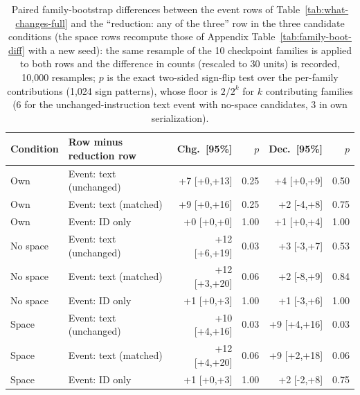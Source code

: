 \begin{table}[t]
\centering\scriptsize
\setlength{\tabcolsep}{2pt}
\begin{tabular}{@{}llrrrr@{}}
\toprule
Condition & Row minus reduction row & Chg.\ [95\%] & $p$ & Dec.\ [95\%] & $p$ \\
\midrule
Own & Event: text (unchanged) & +7 [+0,+13] & 0.25 & +4 [+0,+9] & 0.50 \\
Own & Event: text (matched) & +9 [+0,+16] & 0.25 & +2 [-4,+8] & 0.75 \\
Own & Event: ID only & +0 [+0,+0] & 1.00 & +1 [+0,+4] & 1.00 \\
No space & Event: text (unchanged) & +12 [+6,+19] & 0.03 & +3 [-3,+7] & 0.53 \\
No space & Event: text (matched) & +12 [+3,+20] & 0.06 & +2 [-8,+9] & 0.84 \\
No space & Event: ID only & +1 [+0,+3] & 1.00 & +1 [-3,+6] & 1.00 \\
Space & Event: text (unchanged) & +10 [+4,+16] & 0.03 & +9 [+4,+16] & 0.03 \\
Space & Event: text (matched) & +12 [+4,+20] & 0.06 & +9 [+2,+18] & 0.06 \\
Space & Event: ID only & +1 [+0,+3] & 1.00 & +2 [-2,+8] & 0.75 \\
\bottomrule
\end{tabular}
\caption{Paired family-bootstrap differences between the event rows of Table~\ref{tab:what-changes-full} and the ``reduction: any of the three'' row in the three candidate conditions (the space rows recompute those of Appendix Table~\ref{tab:family-boot-diff} with a new seed): the same resample of the 10 checkpoint families is applied to both rows and the difference in counts (rescaled to 30 units) is recorded, 10,000 resamples; $p$ is the exact two-sided sign-flip test over the per-family contributions (1,024 sign patterns), whose floor is $2/2^k$ for $k$ contributing families (6 for the unchanged-instruction text event with no-space candidates, 3 in own serialization).}
\label{tab:family-boot-events}
\end{table}
